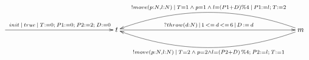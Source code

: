 $\xymatrix{
   \ar[rrrrr]^{init\:|\:true\:|\:T:=0;\:P1:=0;\:P2:=2;\:D:=0} &&&&& {t} \ar[rrrrrrrr]^{?throw(d:N)\,|\,1\,<=\,d\,<=\,6\,|\,D\,:=\,d} &&&&&&&& {m} \ar@/_2pc/[llllllll]_{!move(p:N,l:N)\: |\: T=1 \:\land\: p=1 \:\land\: l = (P1+D)\%4\:|\:P1:=l;\:T:=2} \ar@/^2pc/[llllllll]^{!move(p:N,l:N) \:|\: T=2 \:\land\: p=2 \land l = (P2+D)\,\%4;\: P2:=l;\:T:=1}
}$
